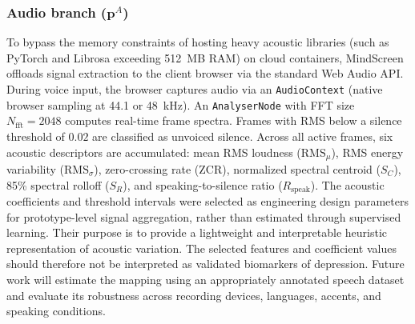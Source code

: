 \documentclass[10pt, conference, letterpaper]{IEEEtran}
\begin{document}
\subsubsection{Audio branch ($\mathbf{p}^A$)}
To bypass the memory constraints of hosting heavy acoustic libraries
(such as PyTorch and Librosa exceeding 512~MB RAM) on cloud containers,
MindScreen offloads signal extraction to the client browser via the standard
Web Audio API.
During voice input, the browser captures audio via an \texttt{AudioContext}
(native browser sampling at 44.1 or 48~kHz).
An \texttt{AnalyserNode} with FFT size $N_{\text{fft}} = 2048$ computes real-time
frame spectra. Frames with RMS below a silence threshold of $0.02$ are classified
as unvoiced silence.
Across all active frames, six acoustic descriptors are accumulated:
mean RMS loudness ($\text{RMS}_\mu$), RMS energy variability ($\text{RMS}_\sigma$),
zero-crossing rate ($\text{ZCR}$), normalized spectral centroid ($S_C$),
85\% spectral rolloff ($S_R$), and speaking-to-silence ratio ($R_{\text{speak}}$).
The acoustic coefficients and threshold intervals were selected as engineering
design parameters for prototype-level signal aggregation, rather than estimated
through supervised learning. Their purpose is to provide a lightweight and
interpretable heuristic representation of acoustic variation. The selected
features and coefficient values should therefore not be interpreted as validated
biomarkers of depression. Future work will estimate the mapping using an
appropriately annotated speech dataset and evaluate its robustness across
recording devices, languages, accents, and speaking conditions.
\end{document}
